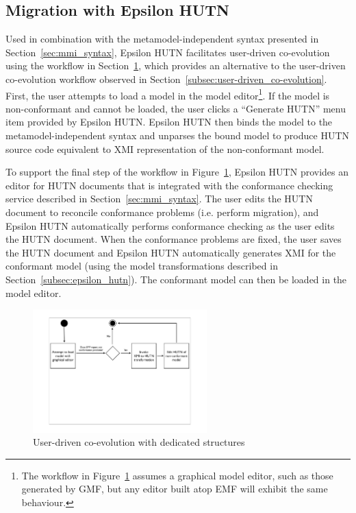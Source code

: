 \subsection{Migration with Epsilon HUTN}
\label{subsec:migration_with_hutn}
Used in combination with the metamodel-independent syntax presented in Section~\ref{sec:mmi_syntax}, Epsilon HUTN facilitates user-driven co-evolution using the workflow in Section~\ref{fig:hutn_process_implementation}, which provides an alternative to the user-driven co-evolution workflow observed in Section~\ref{subsec:user-driven_co-evolution}. First, the user attempts to load a model in the model editor\footnote{The workflow in Figure~\ref{fig:hutn_process_implementation} assumes a graphical model editor, such as those generated by GMF, but any editor built atop EMF will exhibit the same behaviour.}. If the model is non-conformant and cannot be loaded, the user clicks a ``Generate HUTN'' menu item provided by Epsilon HUTN. Epsilon HUTN then binds the model to the metamodel-independent syntax and unparses the bound model to produce HUTN source code equivalent to XMI representation of the non-conformant model.

To support the final step of the workflow in Figure~\ref{fig:hutn_process_implementation}, Epsilon HUTN provides an editor for HUTN documents that is integrated with the conformance checking service described in Section~\ref{sec:mmi_syntax}. The user edits the HUTN document to reconcile conformance problems (i.e. perform migration), and Epsilon HUTN automatically performs conformance checking as the user edits the HUTN document. When the conformance problems are fixed, the user saves the HUTN document and Epsilon HUTN automatically generates XMI for the conformant model (using the model transformations described in Section~\ref{subsec:epsilon_hutn}). The conformant model can then be loaded in the model editor.

\begin{figure}[htbp]
	\centering
	\includegraphics*[viewport=80 290 760 550,height=4.75cm]{6.Evaluation/images/user_driven/hutn_process.pdf}
	\caption{User-driven co-evolution with dedicated structures}
	\label{fig:hutn_process_implementation}
\end{figure}

